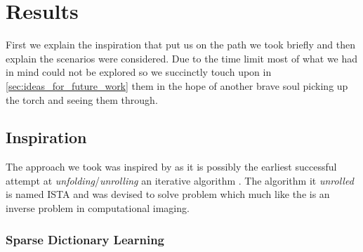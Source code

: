 \chapter{Results}

First we explain the inspiration that put us on the path we took briefly and then explain the scenarios were considered. 
Due to the time limit most of what we had in mind could not be explored so we succinctly touch upon in \cref{sec:ideas_for_future_work} them in the hope of another 
brave soul picking up the torch and seeing them through.  

\section{Inspiration}

The approach we took was inspired by \cite{Gregor2010} as it is possibly the earliest successful attempt at \emph{unfolding}/\emph{unrolling} 
an iterative algorithm \cite{Monga2019}. The algorithm it \emph{unrolled} is named \ac{ISTA}\cite{Daubechies2003} and was devised to solve \sdl\index{\sdl} 
problem which much like the \pr\cite{Shechtman2015}\cite{Jaganathan2015}\index{\pr} is an inverse problem\cite{Kirsch2021} in computational imaging\cite{Khare2023}.

\subsection{Sparse Dictionary Learning}

